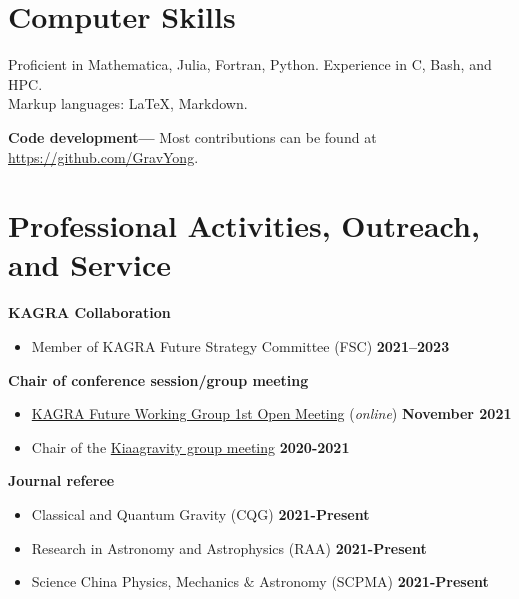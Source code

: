 \documentclass[margin,line]{res}
\begin{document}
\begin{resume}
\section{\sc Computer Skills}
Proficient in {\sc Mathematica}, Julia, Fortran, Python. Experience in C, Bash, and HPC.\\
Markup languages: \LaTeX, Markdown.


{\bf Code development---} Most contributions can be found at \url{https://github.com/GravYong}.

\section{\sc Professional Activities, Outreach, and Service}
{\bf KAGRA Collaboration}
\vspace*{.05in}
\begin{itemize}
\item[] Member of KAGRA Future Strategy Committee (FSC) \hfill{\bf 2021--2023}
\end{itemize}


{\bf Chair of conference session/group meeting}
\vspace*{.05in}
\begin{itemize}
\item[]
\href{https://gwwiki.icrr.u-tokyo.ac.jp/JGWwiki/KAGRA/KSC/FSC/FWG/1stMeeting}{KAGRA Future Working Group 1st Open Meeting} ({\it online}) \hfill {\bf November 2021}
\end{itemize}
\begin{itemize}
  \item[]
  {Chair of the }\href{https://kiaagravity.github.io}{\sc Kiaagravity group meeting}   \hfill {\bf 2020-2021}
  \end{itemize}

{\bf Journal referee}
\vspace*{.05in}
\begin{itemize}
  \item[]
  Classical and Quantum Gravity (CQG)
  \hfill {\bf 2021-Present}
  \item[]
  Research in Astronomy and Astrophysics (RAA)
  \hfill {\bf 2021-Present}
  \item[]
  Science China Physics, Mechanics $\&$ Astronomy (SCPMA)
  \hfill {\bf 2021-Present}
\end{itemize}


\end{resume}
\end{document}
